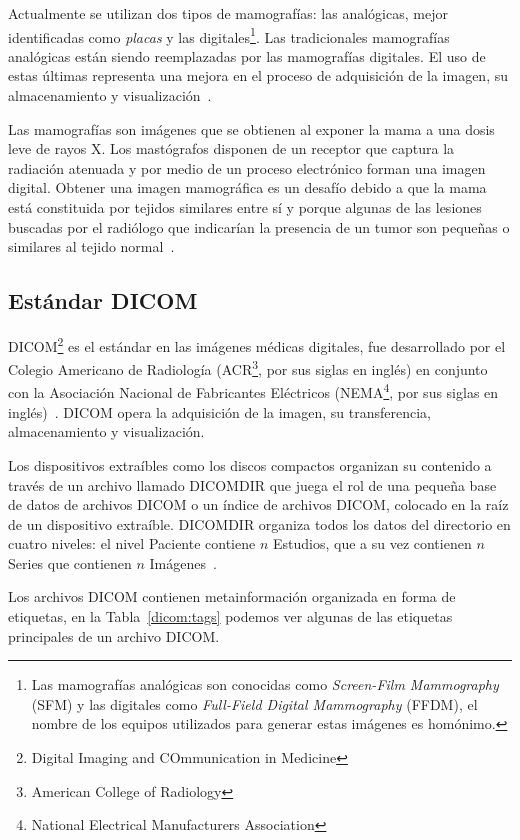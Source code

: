 Actualmente se utilizan dos tipos de mamografías: las analógicas, mejor
identificadas como \textit{placas} y las digitales\footnote{Las mamografías
analógicas son conocidas como \textit{Screen-Film Mammography} (SFM) y las
digitales como \textit{Full-Field Digital Mammography} (FFDM), el nombre de los
equipos utilizados para generar estas imágenes es homónimo.}. Las tradicionales
mamografías analógicas están siendo reemplazadas por las mamografías digitales.
El uso de estas últimas representa una mejora en el proceso de adquisición de
la imagen, su almacenamiento y visualización~\cite{pisano2000current}. 

Las mamografías son imágenes que se obtienen al exponer la mama a una dosis
leve de rayos X. Los mastógrafos disponen de un receptor que captura la
radiación atenuada y por medio de un proceso electrónico forman una imagen
digital. Obtener una imagen mamográfica es un desafío debido a que la mama está
constituida por tejidos similares entre sí y porque algunas de las lesiones
buscadas por el radiólogo que indicarían la presencia de un tumor son pequeñas
o similares al tejido normal~\cite{mxcancer}. 

\subsection{Estándar DICOM}

DICOM\footnote{Digital Imaging and COmmunication in Medicine} es el estándar en
las imágenes médicas digitales, fue desarrollado por el Colegio Americano de
Radiología (ACR\footnote{American College of Radiology}, por sus siglas en
inglés) en conjunto con la Asociación Nacional de Fabricantes Eléctricos
(NEMA\footnote{National Electrical Manufacturers Association}, por sus siglas
en inglés)~\cite{national1996digital}. DICOM opera la adquisición de la imagen,
su transferencia, almacenamiento y visualización. 

Los dispositivos extraíbles como los discos compactos organizan su contenido a
través de un archivo llamado DICOMDIR que juega el rol de una pequeña base de
datos de archivos DICOM o un índice de archivos DICOM, colocado en la raíz de
un dispositivo extraíble. DICOMDIR organiza todos los datos del directorio en 
cuatro niveles: el nivel Paciente contiene $n$ Estudios, que a su vez contienen
$n$ Series que contienen $n$ Imágenes~\cite{pianykh2011digital}.  

Los archivos DICOM contienen metainformación organizada en forma de etiquetas,
en la Tabla~\ref{dicom:tags} podemos ver algunas de las etiquetas principales
de un archivo DICOM. 

